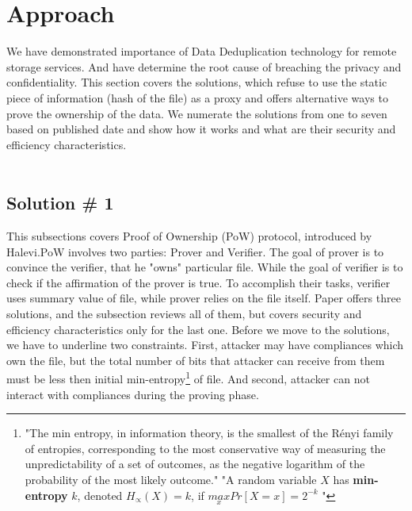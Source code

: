 \documentclass[12pt]{article}
\begin{document}
\section{Approach}
\label{sec:4}

We have demonstrated importance of Data Deduplication technology for remote storage services. And have determine the root  cause of breaching the privacy and confidentiality. This section covers the solutions, which refuse to use the static piece of information (hash of the file) as a proxy and offers alternative ways to prove the ownership of the data. We numerate the solutions from one to seven based on published date and show how it works and what are their security and efficiency characteristics. \\\\
\subsection{Solution \# 1}
\label{sub:Soltuion1}
This subsections covers Proof of Ownership (PoW) protocol, introduced by Halevi.\cite{PoW}PoW involves two parties: Prover and Verifier. The goal of prover is to convince the verifier, that he "owns" particular file. While the goal of verifier is to check if the affirmation of the prover is true. To accomplish their tasks, verifier uses summary value of file, while  prover relies on  the file itself. Paper \cite{PoW} offers three solutions, and the subsection reviews all of them, but covers security and efficiency characteristics only  for the last one. Before we move to the solutions, we have to underline two constraints. First, attacker may have compliances which own the file, but the total number of bits that attacker can receive from them must be less then initial min-entropy\footnote{"The min entropy, in information theory, is the smallest of the Rényi family of entropies, corresponding to the most conservative way of measuring the unpredictability of a set of outcomes, as the negative logarithm of the probability of the most likely outcome." "A random variable $X$ has \textbf{min-entropy} $k$, denoted $H_\propto(X)=k$, if  $\underset{x}{max}Pr[X=x]=2^{-k}$  "\cite{MinEnt} } of file. And second, attacker can not interact with compliances during the proving phase.
\end{document}
